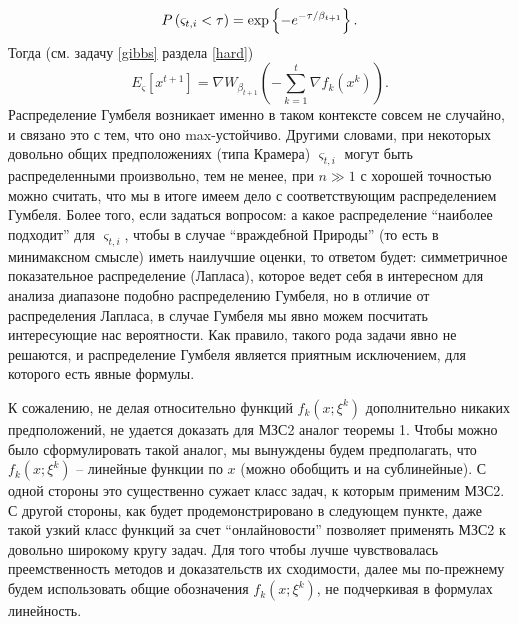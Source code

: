 \[
P\left( {\varsigma _{t,i} <\tau } \right)=\exp \left\{ {-e^{-\tau 
\mathord{\left/ {\vphantom {\tau {\beta _{t+1} }}} \right. 
\kern-\nulldelimiterspace} {\beta _{t+1} }}} \right\}.
\]
Тогда (см. задачу \ref{gibbs} раздела \ref{hard})
\[
E_\varsigma \left[ {x^{t+1}} \right]=\nabla W_{\beta _{t+1} } \left( 
{-\sum\limits_{k=1}^t {\nabla f_k \left( {x^k } \right)} } \right).
\]
Распределение Гумбеля возникает именно в таком контексте совсем не случайно, 
и связано это с тем, что оно max-устойчиво. 
Другими словами, при некоторых довольно общих предположениях (типа Крамера) 
$\varsigma _{t,i} $ могут быть распределенными произвольно, тем не менее, 
при $n\gg 1$ с хорошей точностью можно считать, что мы в итоге имеем дело с 
соответствующим распределением Гумбеля. Более того, если задаться вопросом: 
а какое распределение ``наиболее подходит'' для $\varsigma _{t,i} $, чтобы в 
случае ``враждебной Природы'' (то есть в минимаксном смысле) иметь наилучшие 
оценки, то ответом будет: симметричное показательное распределение 
(Лапласа), которое ведет себя в интересном для анализа диапазоне подобно 
распределению Гумбеля, но в отличие от распределения Лапласа, в случае 
Гумбеля мы явно можем посчитать интересующие нас вероятности. Как правило, 
такого рода задачи явно не решаются, и распределение Гумбеля является 
приятным исключением, для которого есть явные формулы. 

К сожалению, не делая относительно функций $f_k \left( {x;\xi ^k} \right)$ 
дополнительно никаких предположений, не удается доказать для МЗС2 аналог 
теоремы 1. Чтобы можно было сформулировать такой аналог, мы вынуждены будем 
предполагать, что $f_k \left( {x;\xi ^k} \right)$ -- линейные функции по $x$ 
(можно обобщить и на сублинейные). С одной стороны это существенно сужает 
класс задач, к которым применим МЗС2. С другой стороны, как будет 
продемонстрировано в следующем пункте, даже такой узкий класс функций за 
счет ``онлайновости'' позволяет применять МЗС2 к довольно широкому кругу 
задач. Для того чтобы лучше чувствовалась преемственность методов и 
доказательств их сходимости, далее мы по-прежнему будем использовать общие 
обозначения $f_k \left( {x;\xi ^k} \right)$, не подчеркивая в формулах 
линейность.

